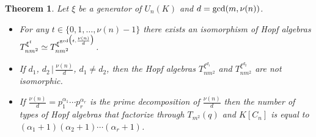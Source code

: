 \documentclass[10pt,a4paper]{amsart}
\numberwithin{equation}{section}
\newtheorem{Theorem}{Theorem}[section]
\begin{document}
\begin{Theorem}\label{counting}
Let $\xi$ be a generator of $U_n (K)$ and $d = {\rm gcd}(m,\nu (n))$.
\begin{itemize}\itemsep=0pt
\item[$1)$] For any $t \in \{0, 1,\dots, \nu(n) - 1\}$ there exists an isomorphism of Hopf algebras $T_{nm^{2}}^ {\xi^{t}} \simeq T_{nm^{2}}^ {\xi^{{\rm gcd}\big(t, \frac{\nu(n)}{d}\big)}}$.
\item[$2)$] If $d_{1}$, $d_{2} \,|\, \frac{\nu(n)}{d}$, $d_{1} \neq d_{2}$, then the Hopf algebras $T_{nm^{2}}^ {\xi^{d_{1}}}$ and $T_{nm^{2}}^
{\xi^{d_{2}}}$ are not isomorphic.
\item[$3)$] If $ \frac{\nu(n)}{d} = p_1^{\alpha_1} \cdots p_r^{\alpha_r}$ is the prime decomposition of $ \frac{\nu(n)}{d}$ then the number of types of Hopf algebras that factorize through $T_{m^{2}}(q)$ and $K[C_n]$ is equal to $(\alpha_1 + 1)(\alpha_2 + 1) \cdots (\alpha_r + 1)$.
\end{itemize}
\end{Theorem}
\end{document}
